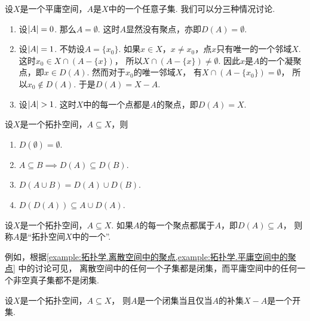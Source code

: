 \begin{example}[平庸空间中的聚点]\label{example:拓扑学.平庸空间中的聚点}
设\(X\)是一个平庸空间，\(A\)是\(X\)中的一个任意子集.
我们可以分三种情况讨论.
\begin{enumerate}
	\item 设\(\abs{A} = 0\).
	那么\(A = \emptyset\).
	这时\(A\)显然没有聚点，亦即\(D(A) = \emptyset\).

	\item 设\(\abs{A} = 1\).
	不妨设\(A = \{x_0\}\).
	如果\(x \in X\)，\(x \neq x_0\)，点\(x\)只有唯一的一个邻域\(X\).
	这时\(x_0 \in X \cap (A - \{x\})\)，
	所以\(X \cap (A - \{x\}) \neq \emptyset\).
	因此\(x\)是\(A\)的一个凝聚点，即\(x \in D(A)\).
	然而对于\(x_0\)的唯一邻域\(X\)，
	有\(X \cap (A - \{x_0\}) = \emptyset\)，
	所以\(x_0 \notin D(A)\).
	于是\(D(A) = X - A\).

	\item 设\(\abs{A} > 1\).
	这时\(X\)中的每一个点都是\(A\)的聚点，即\(D(A) = X\).
\end{enumerate}
\end{example}

\begin{theorem}
设\(X\)是一个拓扑空间，\(A \subseteq X\)，则
\begin{enumerate}
	\item \(D(\emptyset) = \emptyset\).
	\item \(A \subseteq B \implies D(A) \subseteq D(B)\).
	\item \(D(A \cup B) = D(A) \cup D(B)\).
	\item \(D(D(A)) \subseteq A \cup D(A)\).
\end{enumerate}
\end{theorem}

\begin{definition}\label{definition:拓扑学.闭集的概念}
设\(X\)是一个拓扑空间，\(A \subseteq X\).
如果\(A\)的每一个聚点都属于\(A\)，即\(D(A) \subseteq A\)，
则称\(A\)是“拓扑空间\(X\)中的一个”.
\end{definition}

例如，根据\cref{example:拓扑学.离散空间中的聚点,example:拓扑学.平庸空间中的聚点} 中的讨论可见，
离散空间中的任何一个子集都是闭集，而平庸空间中的任何一个非空真子集都不是闭集.

\begin{theorem}\label{theorem:拓扑学.成为闭集的充要条件1}
设\(X\)是一个拓扑空间，\(A \subseteq X\)，
则\(A\)是一个闭集当且仅当\(A\)的补集\(X - A\)是一个开集.
\end{theorem}

